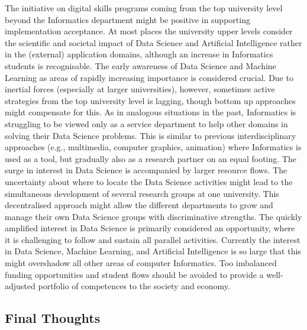 The initiative on digital skills programs coming from the top university level beyond the Informatics department might be positive in supporting implementation acceptance. At most places the university upper levels consider the scientific and societal impact of Data Science and Artificial Intelligence rather in the (external) application domains, although an increase in Informatics students is recognisable. The early awareness of Data Science and Machine Learning as areas of rapidly increasing importance is considered crucial. Due to inertial forces (especially at larger universities), however, sometimes active strategies from the top university level is lagging, though bottom up approaches might compensate for this. As in analogous situations in the past, Informatics is struggling to be viewed only as a service department to help other domains in solving their Data Science problems. This is similar to previous interdisciplinary approaches (e.g., multimedia, computer graphics, animation) where Informatics is used as a tool, but gradually also as a research partner on an equal footing. The surge in interest in Data Science is accompanied by larger resource flows. The uncertainty about where to locate the Data Science activities might lead to the simultaneous development of several research groups at one university. This decentralised approach might allow the different departments to grow and manage their own Data Science groups with discriminative strengths. The quickly amplified interest in Data Science is primarily considered an opportunity, where it is challenging to follow and sustain all parallel activities. Currently the interest in Data Science, Machine Learning, and Artificial Intelligence is so large that this might overshadow all other areas of computer Informatics. Too imbalanced funding opportunities and student flows should be avoided to provide a well-adjusted portfolio of competences to the society and economy.

\subsection{Final Thoughts}

